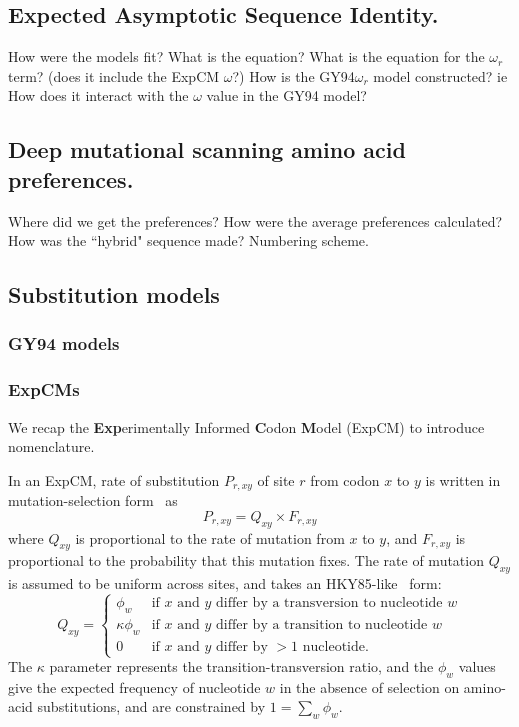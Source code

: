 \documentclass[11pt]{article}
\begin{document}
\subsection*{Expected Asymptotic Sequence Identity.}
How were the models fit? 
What is the equation? 
What is the equation for the $\omega_r$ term? (does it include the ExpCM $\omega$?)
How is the GY94$\omega_r$ model constructed? ie How does it interact with the $\omega$ value in the GY94 model? 

\subsection*{Deep mutational scanning amino acid preferences.}
Where did we get the preferences? 
How were the average preferences calculated? 
How was the ``hybrid" sequence made? 
Numbering scheme. 

\subsection*{Substitution models}
\subsubsection*{GY94 models}
\subsubsection*{ExpCMs}
We recap the \textbf{Exp}erimentally Informed \textbf{C}odon \textbf{M}odel (ExpCM) \citep{bloom2014experimentally,bloom2014informed,bloom2017identification,hilton2017phydms} to introduce nomenclature. 

In an ExpCM, rate of substitution $P_{r,xy}$ of site $r$ from codon $x$ to $y$ is written in mutation-selection form~\citep{halpern1998evolutionary,mccandlish2014modeling,spielman2015relationship} as
\begin{equation}
P_{r,xy} = Q_{xy} \times F_{r,xy}
\end{equation}
where $Q_{xy}$ is proportional to the rate of mutation from $x$ to $y$, and $F_{r,xy}$ is proportional to the probability that this mutation fixes.
The rate of mutation $Q_{xy}$ is assumed to be uniform across sites, and takes an HKY85-like~\citep{hasegawa1985dating} form:
\begin{equation}
Q_{xy} = 
\begin{cases}
\phi_w & \mbox{if $x$ and $y$ differ by a transversion to nucleotide $w$} \\
\kappa \phi_w & \mbox{if $x$ and $y$ differ by a transition to nucleotide $w$} \\
0 & \mbox{if $x$ and $y$ differ by $>1$ nucleotide.}
\end{cases}
\end{equation}
The $\kappa$ parameter represents the transition-transversion ratio, and the $\phi_w$ values give the expected frequency of nucleotide $w$ in the absence of selection on amino-acid substitutions, and are constrained by $1 = \sum_w \phi_w$.
\end{document}
